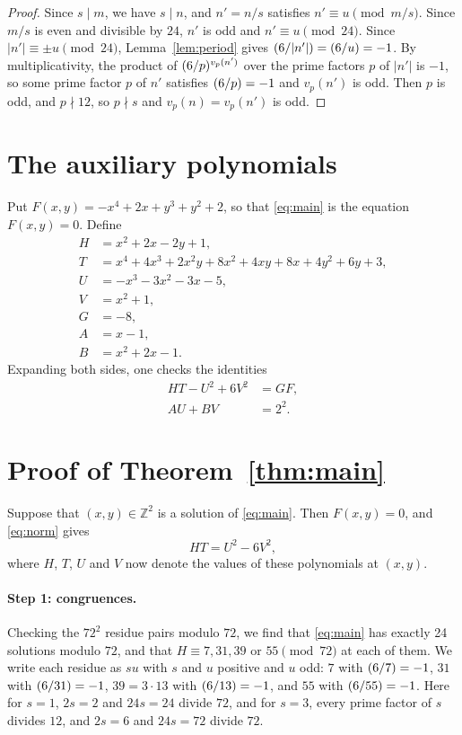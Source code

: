 \documentclass[11pt]{article}
\newcommand{\Z}{\mathbb{Z}}
\newcommand{\leg}[2]{\mathchoice{\biggl(\dfrac{#1}{#2}\biggr)}{(#1/#2)}{(#1/#2)}{(#1/#2)}}
\begin{document}
\begin{proof}
Since $s\mid m$, we have $s\mid n$, and $n'=n/s$ satisfies $n'\equiv u\pmod{m/s}$. Since $m/s$ is even and divisible by $24$, $n'$ is odd and $n'\equiv u\pmod{24}$. Since $|n'|\equiv\pm u\pmod{24}$, Lemma~\ref{lem:period} gives $\leg{6}{|n'|}=\leg{6}{u}=-1$. By multiplicativity, the product of $\leg{6}{p}^{v_p(n')}$ over the prime factors $p$ of $|n'|$ is $-1$, so some prime factor $p$ of $n'$ satisfies $\leg{6}{p}=-1$ and $v_p(n')$ is odd. Then $p$ is odd, and $p\nmid12$, so $p\nmid s$ and $v_p(n)=v_p(n')$ is odd.
\end{proof}

\section{The auxiliary polynomials}

Put $F(x,y)=-x^{4}+2x+y^{3}+y^{2}+2$, so that \eqref{eq:main} is the equation $F(x,y)=0$. Define
\begin{align*}
H&=x^{2}+2x-2y+1,\\
T&=x^{4}+4x^{3}+2x^{2}y+8x^{2}+4xy+8x+4y^{2}+6y+3,\\
U&=-x^{3}-3x^{2}-3x-5,\\
V&=x^{2}+1,\\
G&=-8,\\
A&=x-1,\\
B&=x^{2}+2x-1.
\end{align*}
Expanding both sides, one checks the identities
\begin{align}
HT-U^2+6V^2&=GF,\label{eq:norm}\\
AU+BV&=2^{2}.\label{eq:bezout}
\end{align}

\section{Proof of Theorem~\ref{thm:main}}

Suppose that $(x,y)\in\Z^2$ is a solution of \eqref{eq:main}. Then $F(x,y)=0$, and \eqref{eq:norm} gives
\begin{equation}\label{eq:HT}
HT=U^2-6V^2,
\end{equation}
where $H$, $T$, $U$ and $V$ now denote the values of these polynomials at $(x,y)$.

\paragraph{Step 1: congruences.} Checking the $72^2$ residue pairs modulo $72$, we find that \eqref{eq:main} has exactly 24 solutions modulo $72$, and that $H\equiv7,\allowbreak 31,\allowbreak 39\text{ or }55\pmod{72}$ at each of them. We write each residue as $su$ with $s$ and $u$ positive and $u$ odd: $7$ with $\leg{6}{7}=-1$, $31$ with $\leg{6}{31}=-1$, $39=3\cdot13$ with $\leg{6}{13}=-1$, and $55$ with $\leg{6}{55}=-1$. Here for $s=1$, $2s=2$ and $24s=24$ divide $72$, and for $s=3$, every prime factor of $s$ divides $12$, and $2s=6$ and $24s=72$ divide $72$.
\end{document}
